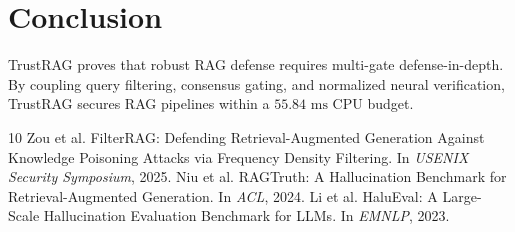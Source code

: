 \documentclass[11pt,a4paper]{article}
\begin{document}
\section{Conclusion}
TrustRAG proves that robust RAG defense requires multi-gate defense-in-depth. By coupling query filtering, consensus gating, and normalized neural verification, TrustRAG secures RAG pipelines within a $55.84\text{ ms}$ CPU budget.


\begin{thebibliography}{10}
Zou et al.
\newblock FilterRAG: Defending Retrieval-Augmented Generation Against Knowledge Poisoning Attacks via Frequency Density Filtering.
\newblock In \textit{USENIX Security Symposium}, 2025.
Niu et al.
\newblock RAGTruth: A Hallucination Benchmark for Retrieval-Augmented Generation.
\newblock In \textit{ACL}, 2024.
Li et al.
\newblock HaluEval: A Large-Scale Hallucination Evaluation Benchmark for LLMs.
\newblock In \textit{EMNLP}, 2023.
\end{thebibliography}
\end{document}

